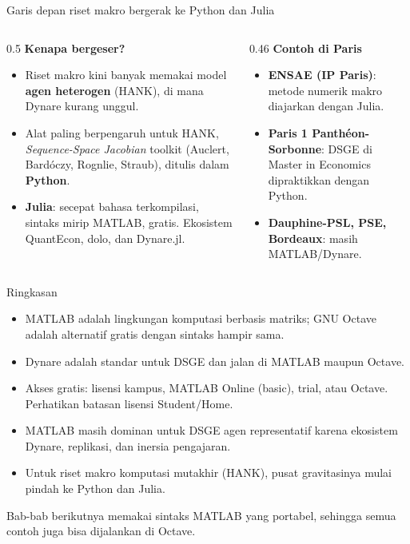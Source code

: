 \documentclass[aspectratio=169,11pt]{beamer}
\begin{document}
\begin{frame}{Garis depan riset makro bergerak ke Python dan Julia}
\begin{columns}[T]
\begin{column}{0.5\textwidth}
\textbf{Kenapa bergeser?}
\begin{itemize}\small
  \item Riset makro kini banyak memakai model \textbf{agen heterogen}
        (HANK), di mana Dynare kurang unggul.
  \item Alat paling berpengaruh untuk HANK, \emph{Sequence-Space Jacobian}
        toolkit (Auclert, Bardóczy, Rognlie, Straub), ditulis dalam
        \textbf{Python}.
  \item \textbf{Julia}: secepat bahasa terkompilasi, sintaks mirip MATLAB,
        gratis. Ekosistem QuantEcon, dolo, dan Dynare.jl.
\end{itemize}
\end{column}
\begin{column}{0.46\textwidth}
\textbf{Contoh di Paris}
\begin{itemize}\small
  \item \textbf{ENSAE (IP Paris)}: metode numerik makro diajarkan dengan
        \alert{Julia}.
  \item \textbf{Paris 1 Panthéon-Sorbonne}: DSGE di Master in Economics
        dipraktikkan dengan \alert{Python}.
  \item \textbf{Dauphine-PSL, PSE, Bordeaux}: masih MATLAB/Dynare.
\end{itemize}
\end{column}
\end{columns}
\end{frame}

\begin{frame}{Ringkasan}
\begin{itemize}
  \item MATLAB adalah lingkungan komputasi berbasis matriks; GNU Octave
        adalah alternatif gratis dengan sintaks hampir sama.
  \item Dynare adalah standar untuk DSGE dan jalan di MATLAB maupun Octave.
  \item Akses gratis: lisensi kampus, MATLAB Online (basic), trial,
        atau Octave. Perhatikan batasan lisensi Student/Home.
  \item MATLAB masih dominan untuk DSGE agen representatif karena ekosistem
        Dynare, replikasi, dan inersia pengajaran.
  \item Untuk riset makro komputasi mutakhir (HANK), pusat gravitasinya
        mulai pindah ke \alert{Python dan Julia}.
\end{itemize}
\vspace{0.4em}
\small Bab-bab berikutnya memakai sintaks MATLAB yang portabel, sehingga
semua contoh juga bisa dijalankan di Octave.
\end{frame}
\end{document}
